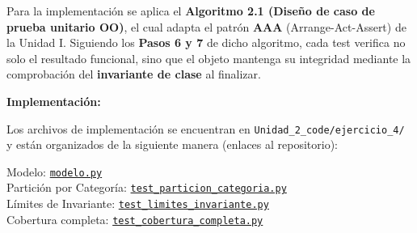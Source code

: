 Para la implementación se aplica el \textbf{Algoritmo 2.1 (Diseño de caso de prueba unitario OO)}, el cual adapta el patrón \textbf{AAA} (Arrange-Act-Assert) de la Unidad I. Siguiendo los \textbf{Pasos 6 y 7} de dicho algoritmo, cada test verifica no solo el resultado funcional, sino que el objeto mantenga su integridad mediante la comprobación del \textbf{invariante de clase} al finalizar.

\textbf{Implementación:}

Los archivos de implementación se encuentran en \texttt{Unidad\_2\_code/ejercicio\_4/} y están organizados de la siguiente manera (enlaces al repositorio):

\noindent Modelo: \href{https://github.com/Cristopher-Ovaillos/Unidad_2_ValidacionVerificacion/blob/main/Unidad_2_code/ejercicio_4/modelo.py}{\texttt{modelo.py}} \\
Partición por Categoría: \href{https://github.com/Cristopher-Ovaillos/Unidad_2_ValidacionVerificacion/blob/main/Unidad_2_code/ejercicio_4/test_particion_categoria.py}{\texttt{test\_particion\_categoria.py}} \\
Límites de Invariante: \href{https://github.com/Cristopher-Ovaillos/Unidad_2_ValidacionVerificacion/blob/main/Unidad_2_code/ejercicio_4/test_limites_invariante.py}{\texttt{test\_limites\_invariante.py}} \\
Cobertura completa: \href{https://github.com/Cristopher-Ovaillos/Unidad_2_ValidacionVerificacion/blob/main/Unidad_2_code/ejercicio_4/test_cobertura_completa.py}{\texttt{test\_cobertura\_completa.py}}

